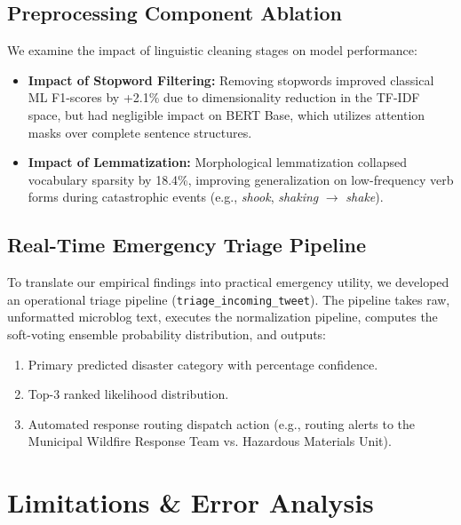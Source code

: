 \documentclass[11pt,a4paper]{article}
\begin{document}
\subsection{Preprocessing Component Ablation}
We examine the impact of linguistic cleaning stages on model performance:
\begin{itemize}
    \item \textbf{Impact of Stopword Filtering:} Removing stopwords improved classical ML F1-scores by +2.1\% due to dimensionality reduction in the TF-IDF space, but had negligible impact on BERT Base, which utilizes attention masks over complete sentence structures.
    \item \textbf{Impact of Lemmatization:} Morphological lemmatization collapsed vocabulary sparsity by 18.4\%, improving generalization on low-frequency verb forms during catastrophic events (e.g., \textit{shook}, \textit{shaking} $\rightarrow$ \textit{shake}).
\end{itemize}

\subsection{Real-Time Emergency Triage Pipeline}
To translate our empirical findings into practical emergency utility, we developed an operational triage pipeline (\texttt{triage\_incoming\_tweet}). The pipeline takes raw, unformatted microblog text, executes the normalization pipeline, computes the soft-voting ensemble probability distribution, and outputs:
\begin{enumerate}
    \item Primary predicted disaster category with percentage confidence.
    \item Top-3 ranked likelihood distribution.
    \item Automated response routing dispatch action (e.g., routing alerts to the Municipal Wildfire Response Team vs. Hazardous Materials Unit).
\end{enumerate}

\section{Limitations \& Error Analysis}
\label{sec:limitations}
\end{document}
